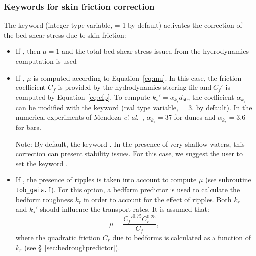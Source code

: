 \subsubsection{Keywords for skin friction correction}
The keyword  (integer type variable, {\ttfamily = 1} by default) activates the correction of the bed shear stress due to skin friction:
\begin{itemize}
\item If , then $\mu=1$ and the total bed shear stress issued from the hydrodynamics computation is used
\item If , $\mu$ is computed according to Equation~\ref{eq:mu}. In this case, the friction coefficient $C_f$ is provided by the hydrodynamics steering file and $C_f'$ is computed by Equation~\ref{eq:cfp}. To compute $k_s'=\alpha_{k_s} d_{50}$, the coefficient $\alpha_{k_s}$ can be modified with the keyword  (real type variable, {\ttfamily = 3.} by default). In the numerical experiments of Mendoza \textit{et al.}~\cite{Mendoza15}, $\alpha_{k_s}=37$ for dunes and $\alpha_{k_s}=3.6$ for bars.

 \begin{WarningBlock}{Note:}
  By default, the keyword . In the presence of very shallow waters, this correction can present stability issues. For this case, we suggest the user to set the keyword .
  \end{WarningBlock}

\item If , the presence of ripples is taken into account to compute $\mu$ (see subroutine \texttt{tob\_gaia.f}). For this option, a bedform predictor is used to calculate the bedform roughness $k_r$ in order to account for the effect of ripples. Both $k_r$
and $k_s'$ should influence the transport rates. It is assumed that:
\begin{equation}\label{eq:mu2}
\mu =\frac{C_f'^{0.75} C_r^{0.25}}{C_f},
\end{equation}
where the quadratic friction $C_r$ due to bedforms is calculated as a
function of $k_r$ (see \S~\ref{sec:bedroughpredictor}).
\end{itemize}

